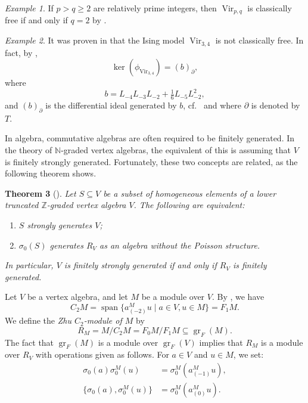 \documentclass[a4paper, 12pt, reqno]{amsart}
\newtheorem{theorem}{Theorem}[section]
\theoremstyle{remark}
\newtheorem{example}[theorem]{Example}
\DeclareMathOperator{\Vir}{Vir}
\DeclareMathOperator{\gr}{gr}
\DeclareMathOperator{\vspan}{span}
\begin{document}
\begin{example}
  \label{exa:18}
  If $p > q \ge 2$ are relatively prime integers, then $\Vir_{p, q}$ is classically free if and only if $q = 2$ by \cite{van_ekeren_chiral_2021}.
\end{example}

\begin{example}
  \label{exa:19}
  It was proven in \cite{andrews_singular_2022} that the Ising model $\Vir_{3, 4}$ is not classically free.
  In fact, by \cite[Theorem 2]{andrews_singular_2022},
  \begin{equation*}
    \ker(\phi_{\Vir_{3, 4}}) = (b)_{\partial},
  \end{equation*}
  where
  \begin{equation*}
    b = L_{-4}L_{-3}L_{-2} + \tfrac{1}{6}L_{-5}L_{-2}^2,
  \end{equation*}
  and $(b)_{\partial}$ is the differential ideal generated by $b$, cf.\  and  where $\partial$ is denoted by $T$.
\end{example}

In algebra, commutative algebras are often required to be finitely generated.
In the theory of $\mathbb{N}$-graded vertex algebras, the equivalent of this is assuming that $V$ is finitely strongly generated.
Fortunately, these two concepts are related, as the following theorem shows.

\begin{theorem}[{\cite[Theorem 4.8]{li_abelianizing_2005}}]
  \label{thr:12}
  Let $S \subseteq V$ be a subset of homogeneous elements of a lower truncated $\mathbb{Z}$-graded vertex algebra $V$.
  The following are equivalent:
  \begin{enumerate}
  \item $S$ strongly generates $V$;
  \item $\sigma_0(S)$ generates $R_V$ as an algebra without the Poisson structure.
  \end{enumerate}
  In particular, $V$ is finitely strongly generated if and only if $R_V$ is finitely generated.
\end{theorem}

Let $V$ be a vertex algebra, and let $M$ be a module over $V$.
By , we have
\begin{equation*}
  C_2M = \vspan\{a^M_{(-2)}u \mid a \in V, u \in M\} = F_1M.
\end{equation*}
We define the \emph{Zhu $C_2$-module of $M$} by
\begin{equation*}
  R_M = M/C_2M = F_0M/F_1M \subseteq \gr_F(M).
\end{equation*}
The fact that $\gr_F(M)$ is a module over $\gr_F(V)$ implies that $R_M$ is a module over $R_V$ with operations given as follows.
For $a \in V$ and $u \in M$, we set:
\begin{align*}
  \sigma_0(a)\sigma^M_0(u) &= \sigma^M_0(a^M_{(-1)}u), \\
  \{\sigma_0(a), \sigma^M_0(u)\} &= \sigma^M_0(a^M_{(0)}u).
\end{align*}
\end{document}
